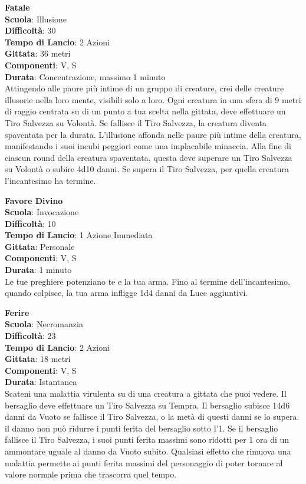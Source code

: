 \begin{multicols}{2}
\medskip\textbf{Fatale}\\
\textbf{Scuola}: Illusione\\
\textbf{Difficoltà}: 30\\
\textbf{Tempo di Lancio}: 2 Azioni\\
\textbf{Gittata}: 36 metri\\
\textbf{Componenti}: V, S\\
\textbf{Durata}: Concentrazione, massimo 1 minuto\\
Attingendo alle paure più intime di un gruppo di creature, crei delle creature illusorie nella loro mente, visibili solo a loro. Ogni creatura in una sfera di 9 metri di raggio centrata su di un punto a tua scelta nella gittata, deve effettuare un Tiro Salvezza su Volontà. Se fallisce il Tiro Salvezza, la creatura diventa spaventata per la durata. L'illusione affonda nelle paure più intime della creatura, manifestando i suoi incubi peggiori come una implacabile minaccia. Alla fine di ciascun round della creatura spaventata, questa deve superare un Tiro Salvezza su Volontà o subire 4d10 danni. Se supera il Tiro Salvezza, per quella creatura l'incantesimo ha termine.

\medskip\textbf{Favore Divino}\\
\textbf{Scuola}: Invocazione\\
\textbf{Difficoltà}: 10\\
\textbf{Tempo di Lancio}: 1 Azione Immediata\\
\textbf{Gittata}: Personale\\
\textbf{Componenti}: V, S\\
\textbf{Durata}: 1 minuto\\
Le tue preghiere potenziano te e la tua arma. Fino al termine dell'incantesimo, quando colpisce, la tua arma infligge 1d4 danni da Luce aggiuntivi.

\medskip\textbf{Ferire}\\
\textbf{Scuola}: Necromanzia\\
\textbf{Difficoltà}: 23\\
\textbf{Tempo di Lancio}: 2 Azioni\\
\textbf{Gittata}: 18 metri\\
\textbf{Componenti}: V, S\\
\textbf{Durata}: Istantanea\\
Scateni una malattia virulenta su di una creatura a gittata che puoi vedere. Il bersaglio deve effettuare un Tiro Salvezza su Tempra. Il bersaglio subisce 14d6 danni da Vuoto se fallisce il Tiro Salvezza, o la metà di questi danni se lo supera. il danno non può ridurre i punti ferita del bersaglio sotto l'1. Se il bersaglio fallisce il Tiro Salvezza, i suoi punti ferita massimi sono ridotti per 1 ora di un ammontare uguale al danno da Vuoto subito. Qualsiasi effetto che rimuova una malattia permette ai punti ferita massimi del personaggio di poter tornare al valore normale prima che trascorra quel tempo.


\end{multicols}
